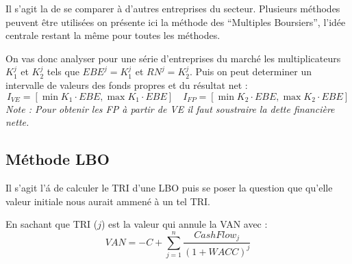 \documentclass[12pt,oneside,a4paper]{article}
\begin{document}
Il s'agit la de se comparer à d'autres entreprises du secteur. Plusieurs méthodes peuvent être utilisées on présente ici la méthode des ``Multiples Boursiers'', l'idée centrale restant la même pour toutes les méthodes.

 On vas donc analyser pour une série d'entreprises du marché les multiplicateurs $K_1^j$ et $K_2^j$ tels que $EBE^j=K_1^j$ et $RN^j=K_2^j$. Puis on peut determiner un intervalle de valeurs des fonds propres et du résultat net : 
\[
	I_{VE}=[\min K_1 \cdot EBE, \max K_1\cdot EBE] \quad I_{FP}=[\min K_2 \cdot EBE, \max K_2\cdot EBE]
\]
\emph{Note : Pour obtenir les FP à partir de VE  il faut soustraire la dette financière nette.}

\subsection{Méthode LBO} %
\label{sub:méthode_lbo}

Il s'agit l'á de calculer le TRI d'une LBO puis se poser la question que qu'elle valeur initiale nous aurait ammené à un tel TRI.

En sachant que TRI ($j$) est la valeur qui annule la VAN avec : 
\[
	VAN = -C+\sum_{j=1}^n\frac{CashFlow_j}{(1+WACC)^j}
\]


\end{document}
